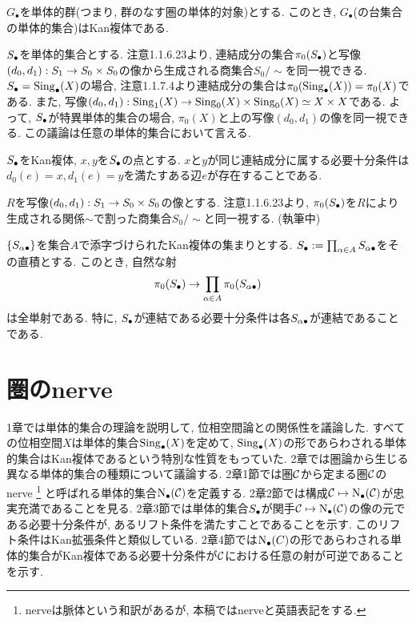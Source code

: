 \documentclass[uplatex, a4paper, 14Q, dvipdfmx]{jsreport}
\begin{document}
\begin{prop}
  $G_\bullet$を単体的群(つまり, 群のなす圏の単体的対象)とする.
  このとき, $G_\bullet$(の台集合の単体的集合)はKan複体である. 
\end{prop}

$\S$を単体的集合とする. 
注意1.1.6.23より, 連結成分の集合$\pi_0(\S)$と写像$(d_0,d_1): S_1 \to S_0 \ti S_0$の像から生成される商集合$S_0 /{\sim}$を同一視できる. 
$\S=\Sing_\bullet(X)$の場合, 注意1.1.7.4より連結成分の集合は$\pi_0(\Sing_\bullet(X))=\pi_0(X)$である. 
また, 写像$(d_0,d_1): \Sing_1(X) \to \Sing_0(X) \ti \Sing_0(X) \simeq X \ti X$である. 
よって, $\S$が特異単体的集合の場合, $\pi_0(X)$と上の写像$(d_0,d_1)$の像を同一視できる. 
この議論は任意の単体的集合において言える.

\begin{prop}
  $\S$をKan複体, $x,y$を$\S$の点とする.
  $x$と$y$が同じ連結成分に属する必要十分条件は$d_0(e)=x, d_1(e)=y$を満たすある辺$e$が存在することである.  
\end{prop}

\begin{Proof}
  $R$を写像$(d_0,d_1): S_1 \to S_0 \ti S_0$の像とする.
  注意1.1.6.23より, $\pi_0(\S)$を$R$により生成される関係${\sim}$で割った商集合$S_0/{\sim}$と同一視する. 
  (執筆中)
\end{Proof}

\begin{cor}
  $\{S_{\al \bullet}\}$を集合$A$で添字づけられたKan複体の集まりとする.
  $\S:= \prod_{\al \in A} S_{\al \bullet}$をその直積とする. 
  このとき, 自然な射
  \begin{align*}
    \pi_0(\S) \to \prod_{\al \in A} \pi_0(S_{\al \bullet})
  \end{align*}
  は全単射である. 
  特に, $\S$が連結である必要十分条件は各$S_{\al \bullet}$が連結であることである. 
\end{cor}

\newpage

\section{圏のnerve}

1章では単体的集合の理論を説明して, 位相空間論との関係性を議論した. 
すべての位相空間$X$は単体的集合$\Sing_\bullet(X)$を定めて, $\Sing_\bullet(X)$の形であらわされる単体的集合はKan複体であるという特別な性質をもっていた. 
2章では圏論から生じる異なる単体的集合の種類について議論する. 
2章1節では圏$\calC$から定まる圏$\calC$のnerve
\footnote{
  nerveは脈体という和訳があるが, 本稿ではnerveと英語表記をする. 
}
と呼ばれる単体的集合$\N(\calC)$を定義する. 
2章2節では構成$\calC \mt \N(\calC)$が忠実充満であることを見る. 
2章3節では単体的集合$\S$が関手$\calC \mt \N(\calC)$の像の元である必要十分条件が, あるリフト条件を満たすことであることを示す. 
このリフト条件はKan拡張条件と類似している. 
2章4節では$\N(C)$の形であらわされる単体的集合がKan複体である必要十分条件が$\calC$における任意の射が可逆であることを示す. 
\end{document}

